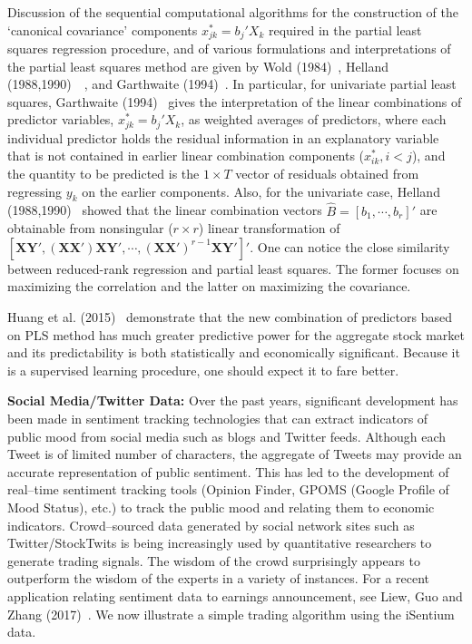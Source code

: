 Discussion of the sequential computational algorithms for the construction of the `canonical covariance' components $x_{jk}^*=b_j'X_k$ required in the partial least squares regression procedure, and of various formulations and interpretations of the partial least squares method are given by Wold (1984)~\cite{wold}, Helland (1988,1990)~\cite{helland88}~\cite{helland90}, and Garthwaite (1994)~\cite{garth}. In particular, for univariate partial least squares, Garthwaite (1994)~\cite{garth} gives the interpretation of the linear combinations of predictor variables, $x_{jk}^*=b_j'X_k$, as weighted averages of predictors, where each individual predictor holds the residual information in an explanatory variable that is not contained in earlier linear combination components ($x_{ik}^*, i<j$), and the quantity to be predicted is the $1 \times T$ vector of residuals obtained from regressing $y_k$ on the earlier components. Also, for the univariate case, Helland (1988,1990)~\cite{helland88,helland90} showed that the linear combination vectors $\hat{B}=[b_1,\cdots,b_r]'$ are obtainable from nonsingular ($r \times r$) linear transformation of $[\mathbf{XY'},  (\mathbf{XX'})\mathbf{XY'}, \cdots, (\mathbf{XX'})^{r-1} \mathbf{XY'}]'$. One can notice the close similarity between reduced-rank regression and partial least squares. The former focuses on maximizing the correlation and the latter on maximizing the covariance.


Huang et al. (2015)~\cite{huang} demonstrate that the new combination of predictors based on PLS method has much greater predictive power for the aggregate stock market and its predictability is both statistically and economically significant. Because it is a supervised learning procedure, one should expect it to fare better. \twomedskip


\noindent \textbf{Social Media/Twitter Data:} Over the past years, significant development has been made in sentiment tracking technologies that can extract indicators of public mood from social media such as blogs and Twitter feeds. Although each Tweet is of limited number of characters, the aggregate of Tweets may provide an accurate representation of public sentiment. This has led to the development of real--time sentiment tracking tools (Opinion Finder, GPOMS (Google Profile of Mood Status), etc.) to track the public mood and relating them to economic indicators. Crowd--sourced data generated by social network sites such as Twitter/StockTwits is being increasingly used by quantitative researchers to generate trading signals. The wisdom of the crowd surprisingly appears to outperform the wisdom of the experts in a variety of instances. For a recent application relating sentiment data to earnings announcement, see Liew, Guo and Zhang (2017)~\cite{liewzhang}. We now illustrate a simple trading algorithm using the iSentium data.


